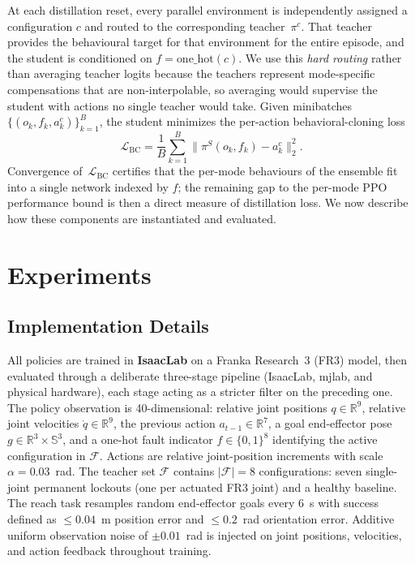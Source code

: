 \documentclass{article}
\begin{document}
		At each distillation reset, every parallel environment is independently assigned a
		configuration $c$ and routed to the corresponding teacher~$\pi^c$. That teacher provides
		the behavioural target for that environment for the entire episode, and the student is
		conditioned on $f = \text{one\_hot}(c)$. We use this \emph{hard routing} rather than
		averaging teacher logits because the teachers represent mode-specific compensations that
		are non-interpolable, so averaging would supervise the student with actions no single
		teacher would take. Given minibatches $\{(o_k, f_k, a_k^c)\}_{k=1}^{B}$, the student
		minimizes the per-action behavioral-cloning loss
		\begin{equation}
		    \mathcal{L}_\mathrm{BC} =
		        \frac{1}{B}\sum_{k=1}^{B}
		        \bigl\|\pi^S(o_k, f_k) - a_k^c\bigr\|_2^{2}.
		    \label{eq:bc}
		\end{equation}
		Convergence of~$\mathcal{L}_\mathrm{BC}$ certifies that the per-mode behaviours of the
		ensemble fit into a single network indexed by $f$; the remaining gap to the per-mode PPO
		performance bound is then a direct measure of distillation loss. We now describe how
		these components are instantiated and evaluated.

\section{Experiments}
\subsection{Implementation Details}
\label{subsec:impl}

		All policies are trained in \textbf{IsaacLab} on a Franka Research~3 (FR3)
		model, then evaluated through a deliberate three-stage pipeline (IsaacLab,
		mjlab, and physical hardware), each stage acting as a stricter filter on the
		preceding one. The policy observation is 40-dimensional: relative joint
		positions $q\in\mathbb{R}^{9}$, relative joint velocities
		$\dot q\in\mathbb{R}^{9}$, the previous action $a_{t-1}\in\mathbb{R}^{7}$,
		a goal end-effector pose $g\in\mathbb{R}^{3}\times\mathbb{S}^{3}$, and a one-hot fault indicator
		$f\in\{0,1\}^{8}$ identifying the active configuration in $\mathcal{F}$.
		Actions are relative
		joint-position increments with scale $\alpha=0.03$~rad. The teacher set
		$\mathcal{F}$ contains $|\mathcal{F}|=8$ configurations: seven single-joint
		permanent lockouts (one per actuated FR3 joint) and a healthy baseline.
		The reach task resamples random 	end-effector goals every 6~s with success defined as $\le 0.04$~m position
		error and $\le 0.2$~rad orientation error.  Additive uniform observation noise
		of $\pm 0.01$~rad is injected on joint positions, velocities, and action
		feedback throughout training.
\end{document}
